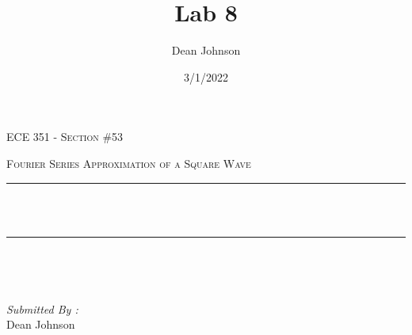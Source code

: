 \documentclass[12pt]{report}
\title{Lab 8}
\author{ Dean Johnson}
\date{3/1/2022}
\makeatletter
\let\thetitle\@title
\makeatother
\begin{document}

\begin{titlepage}
	\centering
    \vspace*{0.5 cm}
\begin{center}    \textsc{\Large   ECE 351 - Section \#53 }\\[2.0 cm]	\end{center}%
	\textsc{\Large Fourier Series Approximation of a Square Wave}\\[0.5 cm]				%
	\rule{\linewidth}{0.2 mm} \\[0.4 cm]
	{ \huge \bfseries \thetitle}\\
	\rule{\linewidth}{0.2 mm} \\[1.5 cm]
	
	\begin{minipage}{0.4\textwidth}
		\begin{flushleft} \large
			\end{flushleft}
			\end{minipage}~
			\begin{minipage}{0.4\textwidth}
            
			\begin{flushright} \large
			\emph{Submitted By :} \\
			Dean Johnson  
		\end{flushright}
           
	\end{minipage}\\[2 cm]
	
    
    
    
    
	
\end{titlepage}


\tableofcontents
\pagebreak

\renewcommand{\thesection}{\arabic{section}}
\end{document}
